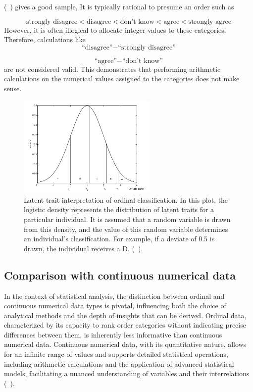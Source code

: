 \documentclass{article}
\begin{document}
(~\textcite{Johnson1999}) gives a good sample,
 It is typically rational to presume an order such as

 \[
 \text{strongly disagree} < \text{disagree} < \text{don’t know} < \text{agree} < \text{strongly agree}
\]
 However, it is often illogical to allocate integer values to these categories. Therefore, calculations like
\[
\text{``disagree''} - \text{``strongly disagree''}
\]

\[
\text{``agree''} - \text{``don't know''}
\]
are not considered valid. 
This demonstrates that performing arithmetic calculations on the numerical values assigned to the categories does not make sense.

\begin{figure}[ht!] %
    \centering %
    \includegraphics[width=0.6\textwidth]{images/ordinal_data_dist.png} %
    \caption{Latent trait interpretation of ordinal classification. 
    In this plot, the logistic density represents the distribution of latent traits for a particular individual. 
    It is assumed that a random variable is drawn from this density, and the value of this random variable determines an individual's classification. 
    For example, if a deviate of 0.5 is drawn, the individual receives a D. (~\cite{Johnson1999}).} %
    \label{fig:ordinal} %
  \end{figure}

\subsection*{Comparison with continuous numerical data}

In the context of statistical analysis, the distinction between ordinal and continuous numerical data types is pivotal, influencing both the choice of analytical methods and the depth of insights that can be derived. 
Ordinal data, characterized by its capacity to rank order categories without indicating precise differences between them, is inherently less informative than continuous numerical data. 
Continuous numerical data, with its quantitative nature, allows for an infinite range of values and supports detailed statistical operations, including arithmetic calculations and the application of advanced statistical models, facilitating a nuanced understanding of variables and their interrelations (~\cite{Stevens1946}).
\end{document}

